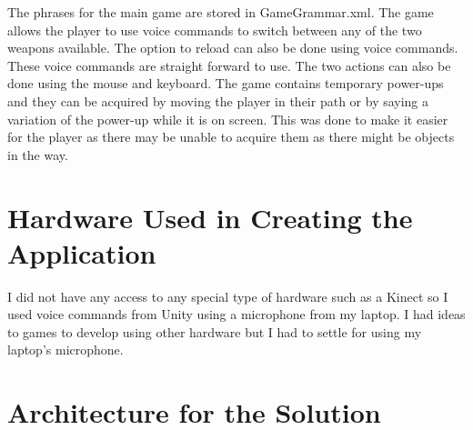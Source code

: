\documentclass{article}
\begin{document}
The phrases for the main game are stored in GameGrammar.xml. The game allows the player to use voice commands to switch between any of the two weapons available. The option to reload can also be done using voice commands. These voice commands are straight forward to use. The two actions can also be done using the mouse and keyboard. The game contains temporary power-ups and they can be acquired by moving the player in their path or by saying a variation of the power-up while it is on screen. This was done to make it easier for the player as there may be unable to acquire them as there might be objects in the way.

\section{Hardware Used in Creating the Application}
I did not have any access to any special type of hardware such as a Kinect so I used voice commands from Unity using a microphone from my laptop. I had ideas to games to develop using other hardware but I had to settle for using my laptop's microphone.

\section{Architecture for the Solution}
\end{document}
